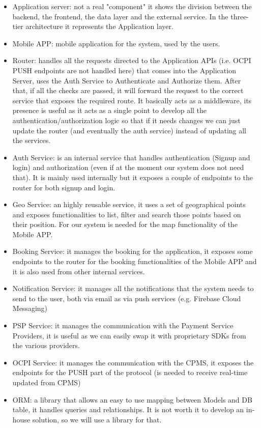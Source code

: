\begin{itemize}
	\item Application server: not a real "component" it shows the division between the backend, the frontend, the data layer and the external service. In the three-tier architecture it represents the Application layer.
	\item Mobile APP: mobile application for the system, used by the users.
	\item Router: handles all the requests directed to the Application APIs (i.e. OCPI PUSH endpoints are not handled here) that comes into the Application Server, uses the Auth Service to Authenticate and Authorize them. After that, if all the checks are passed, it will forward the request to the correct service that exposes the required route. It basically acts as a middleware, its presence is useful as it acts as a single point to develop all the authentication/authorization logic so that if it needs changes we can just update the router (and eventually the auth service) instead of updating all the services.
	\item Auth Service: is an internal service that handles authentication (Signup and login) and authorization (even if at the moment our system does not need that). It is mainly used internally but it exposes a couple of endpoints to the router for both signup and login.
	\item Geo Service: an highly reusable service, it uses a set of geographical points and exposes functionalities to list, filter and search those points based on their position. For our system is needed for the map functionality of the Mobile APP.
	\item Booking Service: it manages the booking for the application, it exposes some endpoints to the router for the booking functionalities of the Mobile APP and it is also used from other internal services.
	\item Notification Service: it manages all the notifications that the system needs to send to the user, both via email as via push services (e.g. Firebase Cloud Messaging)
	\item PSP Service: it manages the communication with the Payment Service Providers, it is useful as we can easily swap it with proprietary SDKs from the various providers.
	\item OCPI Service: it manages the communication with the CPMS, it exposes the endpoints for the PUSH part of the protocol (is needed to receive real-time updated from CPMS)
	\item ORM: a library that allows an easy to use mapping between Models and DB table, it handles queries and relationships. It is not worth it to develop an in-house solution, so we will use a library for that.

\end{itemize}

